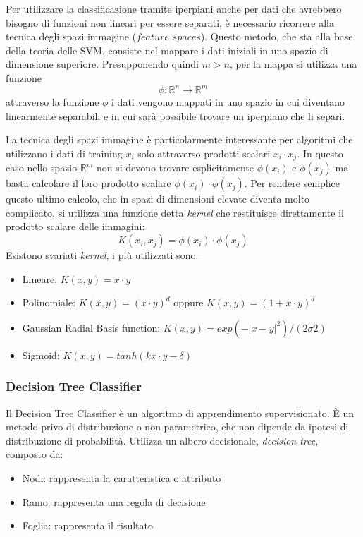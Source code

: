 \documentclass[12pt,italian]{report}
\begin{document}
Per utilizzare la classificazione tramite iperpiani anche per dati che avrebbero bisogno di funzioni non lineari per essere separati, è necessario ricorrere alla tecnica degli spazi immagine ($feature$ $spaces$). Questo metodo, che sta alla base della teoria delle SVM, consiste nel mappare i dati iniziali in uno spazio di dimensione superiore.  Presupponendo quindi $m > n$, per la mappa si utilizza una funzione
\begin{equation}
	\phi: \mathbb{R}^{n} \rightarrow \mathbb{R}^{m}
\end{equation}
attraverso la funzione $\phi$ i dati vengono mappati in uno spazio in cui diventano linearmente separabili e in cui sarà possibile trovare un iperpiano che li separi.

La tecnica degli spazi immagine è particolarmente interessante per algoritmi che utilizzano i dati di training $x_i$ solo attraverso prodotti scalari $x_i \cdot x_j$. In questo caso nello spazio $\mathbb{R}^{m}$ non si devono trovare esplicitamente $\phi(x_i)$ e $\phi (x_j)$ ma basta calcolare il loro prodotto scalare $\phi (x_i) \cdot \phi (x_j)$. Per rendere semplice questo ultimo calcolo, che in spazi di dimensioni elevate diventa molto complicato, si utilizza una funzione detta \textit{kernel} che restituisce direttamente il prodotto scalare delle immagini:
\begin{equation}
K(x_i, x_j) = \phi (x_i) \cdot \phi (x_j)
\end{equation}
Esistono svariati \textit{kernel}, i più utilizzati sono:
\begin{itemize}
	\item Lineare: $K(x, y) = x \cdot y$
	\item Polinomiale: $K(x, y) = (x \cdot y)^{d}$ oppure $K(x, y) = (1 + x \cdot y)^{d}$
	\item Gaussian Radial Basis function: $K(x,y) = exp (- \left | x-y \right |^2)/(2 \sigma 2)$
	\item Sigmoid: $K(x,y) = tanh(k x \cdot y - \delta)$ 
\end{itemize}

\subsubsection{Decision Tree Classifier}
Il Decision Tree Classifier è un algoritmo di apprendimento supervisionato. È un metodo privo di distribuzione o non parametrico, che non dipende da ipotesi di distribuzione di probabilità. Utilizza un albero decisionale, \textit{decision tree}, composto da:
\begin{itemize}
	\item Nodi: rappresenta la caratteristica o attributo
	\item Ramo: rappresenta una regola di decisione
	\item Foglia: rappresenta il risultato
\end{itemize}
\end{document}
